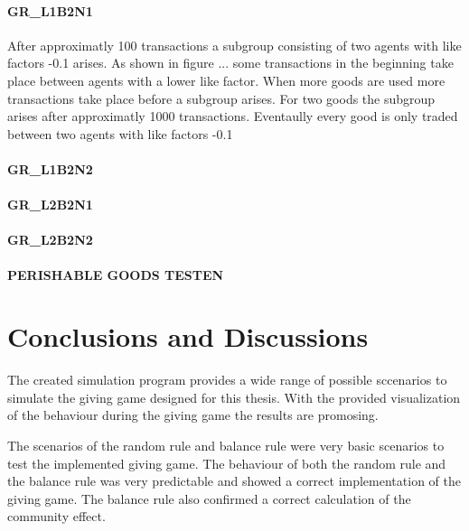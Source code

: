 \documentclass[twoside,openright]{uva-bachelor-thesis}
\begin{document}
\subsubsection{GR\_L1B2N1}
After approximatly 100 transactions a subgroup consisting of two agents with like factors -0.1 arises. As shown in figure ... some transactions in the beginning take place between agents with a lower like factor. When more goods are used more transactions take place before a subgroup arises. For two goods the subgroup arises after approximatly 1000 transactions. Eventaully every good is only traded between two agents with like factors -0.1


\subsubsection{GR\_L1B2N2}

\subsubsection{GR\_L2B2N1}

\subsubsection{GR\_L2B2N2}



\textbf{PERISHABLE GOODS TESTEN}




\chapter{Conclusions and Discussions}
The created simulation program provides a wide range of possible sccenarios to simulate the giving game designed for this thesis. With the provided visualization of the behaviour during the giving game the results are promosing. 

The scenarios of the random rule and balance rule were very basic scenarios to test the implemented giving game. The behaviour of both the random rule and the balance rule was very predictable and showed a correct implementation of the giving game. The balance rule also confirmed a correct calculation of the community effect.
\end{document}
